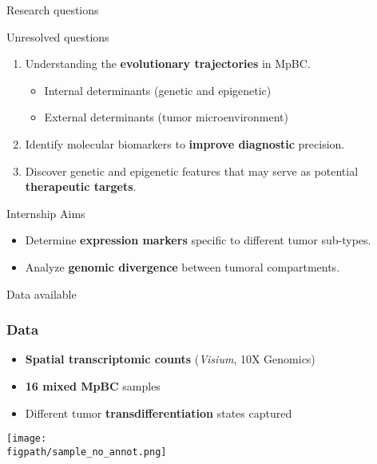 \documentclass[aspectratio=169]{beamer}
\newcommand{\figpath}{/mnt/datadisk/Jordan/Delivrables/Rapports/Rapport_stage/Figures/Sans_légendes}
\begin{document}
\begin{frame}{Research questions}

    \begin{block}{Unresolved questions}
        \begin{enumerate}
            \item Understanding the \textbf{evolutionary trajectories} in MpBC.
            \begin{itemize}
                \item Internal determinants (genetic and epigenetic)
                \item External determinants (tumor microenvironment)
            \end{itemize} 
            \item Identify molecular biomarkers to \textbf{improve diagnostic} precision.
            \item Discover genetic and epigenetic features that may serve as potential \textbf{therapeutic targets}.
        \end{enumerate}
    \end{block}

    \vspace{0.5cm}

    \begin{block}{Internship Aims}
        \begin{itemize}
            \item Determine \textbf{expression markers} specific to different tumor sub-types.
            \item Analyze \textbf{genomic divergence} between tumoral compartments.
        \end{itemize}
    \end{block}
    
\end{frame}



\begin{frame}{Data available}
    \frametitle{Data}

    \begin{minipage}{0.58\textwidth}
        \begin{itemize}
            \item \textbf{Spatial transcriptomic counts} (\emph{Visium}, 10X Genomics)
            \item \textbf{16 mixed MpBC} samples
            \item Different tumor \textbf{transdifferentiation} states captured
        \end{itemize}
    \end{minipage}
    \hfill
    \begin{minipage}{0.4\textwidth}
        \centering
        \texttt{[image: \\figpath/sample\_no\_annot.png]}
        \vspace{0.3em}
    \end{minipage}
\end{frame}
\end{document}
